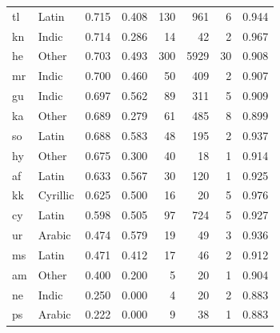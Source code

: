\begin{tabular}{llrrrrrr}
tl & Latin & 0.715 & 0.408 & 130 & 961 & 6 & 0.944 \\
kn & Indic & 0.714 & 0.286 & 14 & 42 & 2 & 0.967 \\
he & Other & 0.703 & 0.493 & 300 & 5929 & 30 & 0.908 \\
mr & Indic & 0.700 & 0.460 & 50 & 409 & 2 & 0.907 \\
gu & Indic & 0.697 & 0.562 & 89 & 311 & 5 & 0.909 \\
ka & Other & 0.689 & 0.279 & 61 & 485 & 8 & 0.899 \\
so & Latin & 0.688 & 0.583 & 48 & 195 & 2 & 0.937 \\
hy & Other & 0.675 & 0.300 & 40 & 18 & 1 & 0.914 \\
af & Latin & 0.633 & 0.567 & 30 & 120 & 1 & 0.925 \\
kk & Cyrillic & 0.625 & 0.500 & 16 & 20 & 5 & 0.976 \\
cy & Latin & 0.598 & 0.505 & 97 & 724 & 5 & 0.927 \\
ur & Arabic & 0.474 & 0.579 & 19 & 49 & 3 & 0.936 \\
ms & Latin & 0.471 & 0.412 & 17 & 46 & 2 & 0.912 \\
am & Other & 0.400 & 0.200 & 5 & 20 & 1 & 0.904 \\
ne & Indic & 0.250 & 0.000 & 4 & 20 & 2 & 0.883 \\
ps & Arabic & 0.222 & 0.000 & 9 & 38 & 1 & 0.883 \\
\bottomrule
\end{tabular}
